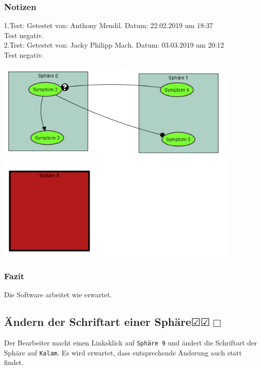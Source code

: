 \documentclass[enabledeprecatedfontcommands]{scrartcl}
\newcommand{\subsectiont}[2]{\subsection[#1]{#1{\normalsize\normalfont #2}}}
\newcommand{\leer}{$\Box$}
\newcommand{\ok}{$\CheckedBox$}
\begin{document}
\subsubsection{Notizen}
1.Test: Getestet von: Anthony Mendil. Datum: 22.02.2019 um 18:37 \\
Test negativ.\\
2.Test: Getestet von: Jacky Philipp Mach. Datum: 03.03.2019 um 20:12 \\
Test negativ. 
\begin{center}
\includegraphics[height=10cm]{2_14.PNG}
\end{center}
\subsubsection{Fazit}
Die Software arbeitet wie erwartet.

\subsectiont{Ändern der Schriftart einer Sphäre}{\dotfill\ok\ok\leer}
Der Bearbeiter macht einen Linksklick auf \texttt{Sphäre 9} und ändert die Schriftart der Sphäre auf \texttt{Kalam}. Es wird erwartet, dass entsprechende Änderung auch statt findet. 
\end{document}

